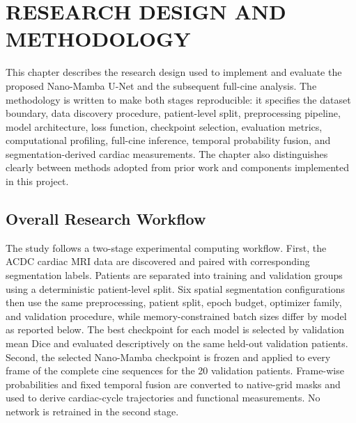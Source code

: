 
\chapter{RESEARCH DESIGN AND METHODOLOGY}
\label{chap:methodology}

This chapter describes the research design used to implement and evaluate the proposed Nano-Mamba U-Net and the subsequent full-cine analysis. The methodology is written to make both stages reproducible: it specifies the dataset boundary, data discovery procedure, patient-level split, preprocessing pipeline, model architecture, loss function, checkpoint selection, evaluation metrics, computational profiling, full-cine inference, temporal probability fusion, and segmentation-derived cardiac measurements. The chapter also distinguishes clearly between methods adopted from prior work and components implemented in this project.

\section{Overall Research Workflow}
The study follows a two-stage experimental computing workflow. First, the ACDC cardiac MRI data are discovered and paired with corresponding segmentation labels. Patients are separated into training and validation groups using a deterministic patient-level split. Six spatial segmentation configurations then use the same preprocessing, patient split, epoch budget, optimizer family, and validation procedure, while memory-constrained batch sizes differ by model as reported below. The best checkpoint for each model is selected by validation mean Dice and evaluated descriptively on the same held-out validation patients. Second, the selected Nano-Mamba checkpoint is frozen and applied to every frame of the complete cine sequences for the 20 validation patients. Frame-wise probabilities and fixed temporal fusion are converted to native-grid masks and used to derive cardiac-cycle trajectories and functional measurements. No network is retrained in the second stage.


